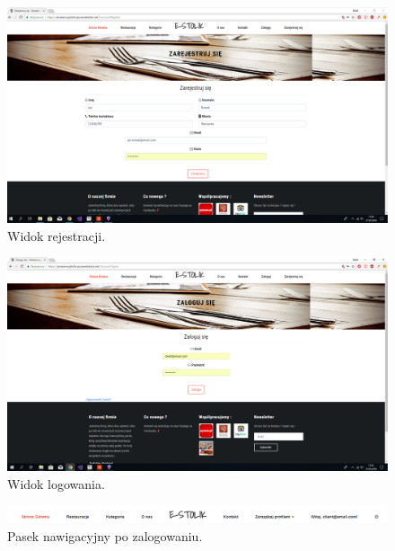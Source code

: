 \documentclass{article}
\begin{document}
\begin{figure}[H]
\centering
	\includegraphics[width=1.00\textwidth]{screens/register.png}
	\caption[caption]{Widok rejestracji.}
	\label{fig:register}
\end{figure}

\begin{figure}[H]
\centering
	\includegraphics[width=1.00\textwidth]{screens/login.png}
	\caption[caption]{Widok logowania.}
	\label{fig:login}
\end{figure}

\begin{figure}[H]
\centering
	\includegraphics[width=1.00\textwidth]{screens/loged_in.png}
	\caption[caption]{Pasek nawigacyjny po zalogowaniu.}
	\label{fig:loged_in}
\end{figure}
\end{document}
